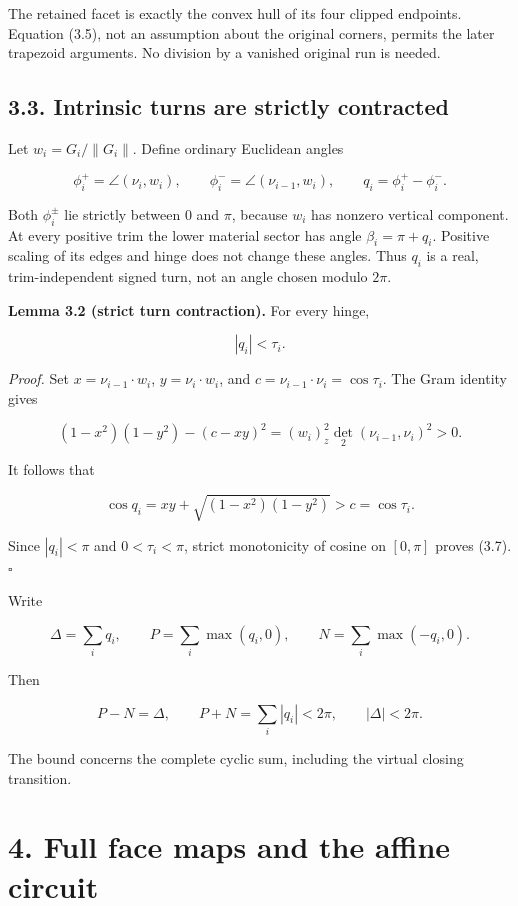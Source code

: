 \documentclass[
  11pt,
  letterpaper,
]{article}
\begin{document}
The retained facet is exactly the convex hull of its four clipped
endpoints. Equation (3.5), not an assumption about the original corners,
permits the later trapezoid arguments. No division by a vanished
original run is needed.

\subsection{3.3. Intrinsic turns are strictly
contracted}\label{intrinsic-turns-are-strictly-contracted}

Let \(w_i=G_i/\|G_i\|\). Define ordinary Euclidean angles

\[
\phi_i^+=\angle(\nu_i,w_i),\qquad
\phi_i^-=\angle(\nu_{i-1},w_i),\qquad
q_i=\phi_i^+-\phi_i^-.
\tag{3.6}
\]

Both \(\phi_i^\pm\) lie strictly between \(0\) and \(\pi\), because
\(w_i\) has nonzero vertical component. At every positive trim the lower
material sector has angle \(\beta_i=\pi+q_i\). Positive scaling of its
edges and hinge does not change these angles. Thus \(q_i\) is a real,
trim-independent signed turn, not an angle chosen modulo \(2\pi\).

\textbf{Lemma 3.2 (strict turn contraction).} For every hinge,

\[
|q_i|<\tau_i.
\tag{3.7}
\]

\emph{Proof.} Set \(x=\nu_{i-1}\cdot w_i\), \(y=\nu_i\cdot w_i\), and
\(c=\nu_{i-1}\cdot\nu_i=\cos\tau_i\). The Gram identity gives

\[
(1-x^2)(1-y^2)-(c-xy)^2
=(w_i)_z^2\det_2(\nu_{i-1},\nu_i)^2>0.
\]

It follows that

\[
\cos q_i=xy+\sqrt{(1-x^2)(1-y^2)}>c=\cos\tau_i.
\]

Since \(|q_i|<\pi\) and \(0<\tau_i<\pi\), strict monotonicity of cosine
on \([0,\pi]\) proves (3.7). \(\square\)

Write

\[
\Delta=\sum_iq_i,\qquad
P=\sum_i\max(q_i,0),\qquad
N=\sum_i\max(-q_i,0).
\]

Then

\[
P-N=\Delta,\qquad
P+N=\sum_i|q_i|<2\pi,\qquad
|\Delta|<2\pi.
\tag{3.8}
\]

The bound concerns the complete cyclic sum, including the virtual
closing transition.

\section{4. Full face maps and the affine
circuit}\label{full-face-maps-and-the-affine-circuit}
\end{document}
